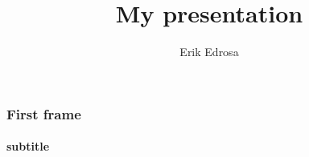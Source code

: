 \documentclass{beamer}
\title{My presentation}
\author{Erik Edrosa}
\institute [PLUG]{Panther Linux User Group}
\date{} %
\begin{document}
\frame{\maketitle}
\begin{frame}
    \frametitle{First frame}
    \framesubtitle{subtitle}
\end{frame}
\end{document}
